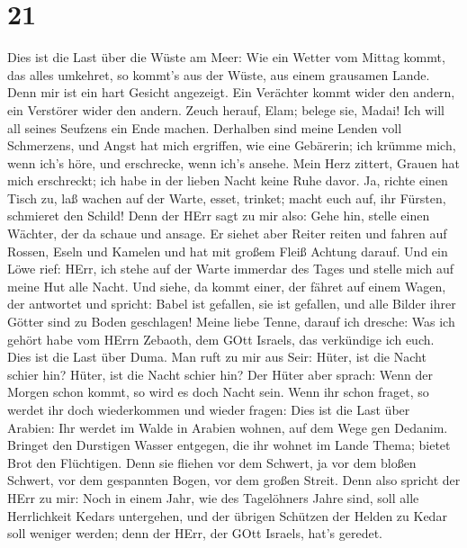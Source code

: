 \hypertarget{section-20}{%
\section{21}\label{section-20}}

 Dies ist die Last über die Wüste am Meer: Wie ein Wetter
vom Mittag kommt, das alles umkehret, so kommt's aus der Wüste, aus
einem grausamen Lande.  Denn mir ist ein hart Gesicht
angezeigt. Ein Verächter kommt wider den andern, ein Verstörer wider den
andern. Zeuch herauf, Elam; belege sie, Madai! Ich will all seines
Seufzens ein Ende machen.  Derhalben sind meine Lenden voll
Schmerzens, und Angst hat mich ergriffen, wie eine Gebärerin; ich krümme
mich, wenn ich's höre, und erschrecke, wenn ich's ansehe. 
Mein Herz zittert, Grauen hat mich erschreckt; ich habe in der lieben
Nacht keine Ruhe davor.  Ja, richte einen Tisch zu, laß
wachen auf der Warte, esset, trinket; macht euch auf, ihr Fürsten,
schmieret den Schild!  Denn der HErr sagt zu mir also: Gehe
hin, stelle einen Wächter, der da schaue und ansage.  Er
siehet aber Reiter reiten und fahren auf Rossen, Eseln und Kamelen und
hat mit großem Fleiß Achtung darauf.  Und ein Löwe rief:
HErr, ich stehe auf der Warte immerdar des Tages und stelle mich auf
meine Hut alle Nacht.  Und siehe, da kommt einer, der fähret
auf einem Wagen, der antwortet und spricht: Babel ist gefallen, sie ist
gefallen, und alle Bilder ihrer Götter sind zu Boden geschlagen!
 Meine liebe Tenne, darauf ich dresche: Was ich gehört habe
vom HErrn Zebaoth, dem GOtt Israels, das verkündige ich euch.
 Dies ist die Last über Duma. Man ruft zu mir aus Seir:
Hüter, ist die Nacht schier hin? Hüter, ist die Nacht schier hin?
 Der Hüter aber sprach: Wenn der Morgen schon kommt, so
wird es doch Nacht sein. Wenn ihr schon fraget, so werdet ihr doch
wiederkommen und wieder fragen:  Dies ist die Last über
Arabien: Ihr werdet im Walde in Arabien wohnen, auf dem Wege gen
Dedanim.  Bringet den Durstigen Wasser entgegen, die ihr
wohnet im Lande Thema; bietet Brot den Flüchtigen.  Denn
sie fliehen vor dem Schwert, ja vor dem bloßen Schwert, vor dem
gespannten Bogen, vor dem großen Streit.  Denn also spricht
der HErr zu mir: Noch in einem Jahr, wie des Tagelöhners Jahre sind,
soll alle Herrlichkeit Kedars untergehen,  und der übrigen
Schützen der Helden zu Kedar soll weniger werden; denn der HErr, der
GOtt Israels, hat's geredet.

